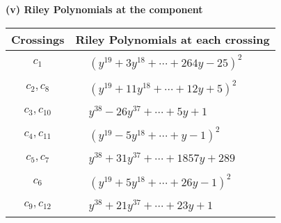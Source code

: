 \documentclass[1p]{elsarticle_modified}
\theoremstyle{definition}
\begin{document}
\newpage\renewcommand{\arraystretch}{1}
\flushleft \textbf{(v) Riley Polynomials at the component}\newline \\
\begin{tabular}{m{50pt}|m{274pt}}
Crossings & \hspace{64pt}Riley Polynomials at each crossing \\
\hline $$\begin{aligned}c_{1}\end{aligned}$$&$\begin{aligned}
&(y^{19}+3 y^{18}+\cdots+264 y-25)^{2}
\end{aligned}$\\
\hline $$\begin{aligned}c_{2},c_{8}\end{aligned}$$&$\begin{aligned}
&(y^{19}+11 y^{18}+\cdots+12 y+5)^{2}
\end{aligned}$\\
\hline $$\begin{aligned}c_{3},c_{10}\end{aligned}$$&$\begin{aligned}
&y^{38}-26 y^{37}+\cdots+5 y+1
\end{aligned}$\\
\hline $$\begin{aligned}c_{4},c_{11}\end{aligned}$$&$\begin{aligned}
&(y^{19}-5 y^{18}+\cdots+y-1)^{2}
\end{aligned}$\\
\hline $$\begin{aligned}c_{5},c_{7}\end{aligned}$$&$\begin{aligned}
&y^{38}+31 y^{37}+\cdots+1857 y+289
\end{aligned}$\\
\hline $$\begin{aligned}c_{6}\end{aligned}$$&$\begin{aligned}
&(y^{19}+5 y^{18}+\cdots+26 y-1)^{2}
\end{aligned}$\\
\hline $$\begin{aligned}c_{9},c_{12}\end{aligned}$$&$\begin{aligned}
&y^{38}+21 y^{37}+\cdots+23 y+1
\end{aligned}$\\
\hline
\end{tabular}\\~\\
\end{document}
